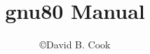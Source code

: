 %
\title{\Huge  gnu80 Manual}
\author{\Huge \copyright David B. Cook} 
\date{}
%
\def\theequation{\thesection.\arabic{equation}}
\maketitle
\tableofcontents


\begin{Appendix}
  
\end{Appendix}

\begin{Appendix}
  
  
  
  
\end{Appendix}

\begin{Appendix}
  
\end{Appendix}

\begin{Appendix}
   
\end{Appendix}



